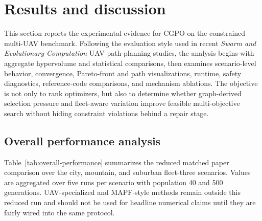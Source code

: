 %
%

\section{Results and discussion}
\label{sec:results}

This section reports the experimental evidence for CGPO on the constrained multi-UAV benchmark. Following the evaluation style used in recent \textit{Swarm and Evolutionary Computation} UAV path-planning studies, the analysis begins with aggregate hypervolume and statistical comparisons, then examines scenario-level behavior, convergence, Pareto-front and path visualizations, runtime, safety diagnostics, reference-code comparisons, and mechanism ablations. The objective is not only to rank optimizers, but also to determine whether graph-derived selection pressure and fleet-aware variation improve feasible multi-objective search without hiding constraint violations behind a repair stage.

\subsection{Overall performance analysis}
\label{subsec:overall-performance}

Table~\ref{tab:overall-performance} summarizes the reduced matched paper comparison over the city, mountain, and suburban fleet-three scenarios. Values are aggregated over five runs per scenario with population 40 and 500 generations. UAV-specialized and MAPF-style methods remain outside this reduced run and should not be used for headline numerical claims until they are fairly wired into the same protocol.

